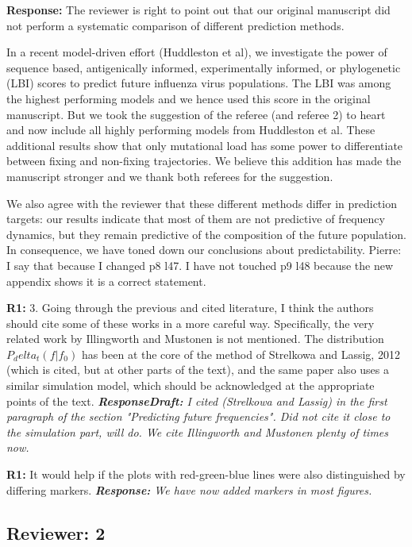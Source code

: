 \documentclass[aps,rmp,onecolumn]{revtex4-1}
\newcommand{\pierre}[1]{{\color{red}Pierre: #1}}
\newcommand{\refa}[1]{\textbf{R1:} #1\vskip 5mm}
\newcommand{\response}[1]{{\it {\color{response}\textbf{Response:} #1}}\vskip 5mm}
\newcommand{\responsedraft}[1]{{\it {\color{purple}\textbf{ResponseDraft:} #1}}\vskip 5mm}
\begin{document}
\response{The reviewer is right to point out that our original manuscript did not perform a systematic comparison of different prediction methods. 

In a recent model-driven effort (Huddleston et al), we investigate the power of sequence based, antigenically informed, experimentally informed, or phylogenetic (LBI) scores to predict future influenza virus populations.
The LBI was among the highest performing models and we hence used this score in the original manuscript.
But we took the suggestion of the referee (and referee 2) to heart and now include all highly performing models from Huddleston et al.
These additional results show that only mutational load has some power to differentiate between fixing and non-fixing trajectories.
We believe this addition has made the manuscript stronger and we thank both referees for the suggestion.

We also agree with the reviewer that these different methods differ in prediction targets: our results indicate that most of them are not predictive of frequency dynamics, but they remain predictive of the composition of the future population. 
In consequence, we have toned down our conclusions about predictability. \pierre{I say that because I changed p8 l47. I have not touched p9 l48 because the new appendix shows it is a correct statement.}
}

\refa{3. Going through the previous and cited literature, I think the authors should cite some of these works in a more careful way. Specifically, the very related work by Illingworth and Mustonen is not mentioned. The distribution $P_delta_t(f|f_0)$ has been at the core of
the method of Strelkowa and Lassig, 2012 (which is cited, but at other
parts of the text), and the same paper also uses a similar simulation model, which should be acknowledged at the appropriate points of the text.}
\responsedraft{I cited (Strelkowa and Lassig) in the first paragraph of the section "Predicting future frequencies". 
Did not cite it close to the simulation part, will do. 
We cite Illingworth and Mustonen plenty of times now. 
}

\refa{It would help if the plots with red-green-blue lines were also distinguished by differing markers.}
\response{We have now added markers in most figures.}


\subsection*{Reviewer: 2}
\end{document}
